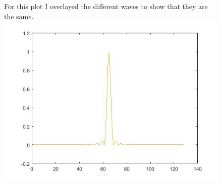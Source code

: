 \documentclass{article}
\begin{document}
\begin{figure}[H]
	For this plot I overlayed the different waves to show that they are the same.
  \includegraphics[scale=.5]{4_same}
  \begin{center}
  \end{center}
  \end{figure}
\end{document}
